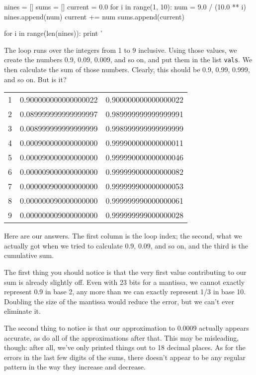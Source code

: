 \begin{VerbIn}
nines = []
sums = []
current = 0.0
for i in range(1, 10):
    num = 9.0 / (10.0 ** i)
    nines.append(num)
    current += num
    sums.append(current)

for i in range(len(nines)):
    print '%
\end{VerbIn}

The loop runs over the integers from 1 to 9 inclusive. Using those
values, we create the numbers 0.9, 0.09, 0.009, and so on, and put them
in the list \texttt{vals}. We then calculate the sum of those numbers.
Clearly, this should be 0.9, 0.99, 0.999, and so on. But is it?

\begin{tabular}{lll}
1 & 0.900000000000000022 & 0.900000000000000022 \\
2 & 0.089999999999999997 & 0.989999999999999991 \\
3 & 0.008999999999999999 & 0.998999999999999999 \\
4 & 0.000900000000000000 & 0.999900000000000011 \\
5 & 0.000090000000000000 & 0.999990000000000046 \\
6 & 0.000009000000000000 & 0.999999000000000082 \\
7 & 0.000000900000000000 & 0.999999900000000053 \\
8 & 0.000000090000000000 & 0.999999990000000061 \\
9 & 0.000000009000000000 & 0.999999999000000028 \\
\end{tabular}

Here are our answers. The first column is the loop index; the second,
what we actually got when we tried to calculate 0.9, 0.09, and so on,
and the third is the cumulative sum.

The first thing you should notice is that the very first value
contributing to our sum is already slightly off. Even with 23 bits for a
mantissa, we cannot exactly represent 0.9 in base 2, any more than we
can exactly represent 1/3 in base 10. Doubling the size of the mantissa
would reduce the error, but we can't ever eliminate it.

The second thing to notice is that our approximation to 0.0009 actually
appears accurate, as do all of the approximations after that. This may
be misleading, though: after all, we've only printed things out to 18
decimal places. As for the errors in the last few digits of the sums,
there doesn't appear to be any regular pattern in the way they increase
and decrease.

